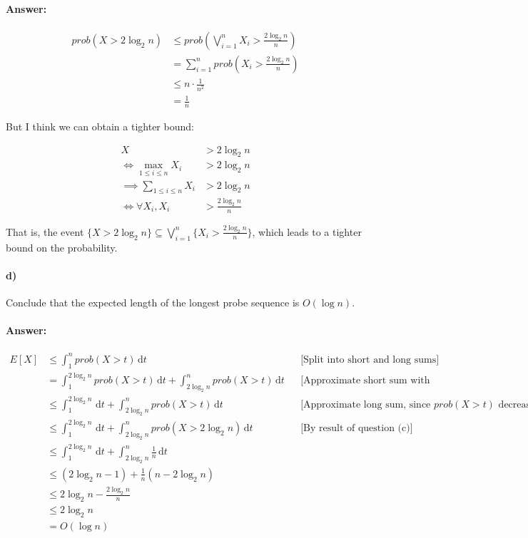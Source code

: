 \documentclass[a4paper]{article}
\begin{document}
\paragraph{Answer:}

\begin{align*}
{prob}(X > 2 \log_2 n) & \le {prob}(\bigvee\limits_{i=1}^n X_i > \frac{2 \log_2 n}{n}) \\
& = \sum\limits_{i=1}^n {prob}(X_i > \frac{2 \log_2 n}{n}) \\
& \le n \cdot \frac{1}{n^2} \\
& = \frac{1}{n}
\end{align*}

But I think we can obtain a tighter bound:

\begin{align*}
X & > 2 \log_2 n \\
\iff \max\limits_{1 \le i \le n} X_i & > 2 \log_2 n \\
\implies \sum\limits_{1 \le i \le n} X_i & > 2 \log_2 n \\
\iff \forall X_i, X_i & > \frac{2 \log_2 n}{n}
\end{align*}

That is, the event $\{X > 2 \log_2 n\} \subseteq \bigvee\limits_{i=1}^n \{X_i > \frac{2 \log_2 n}{n}\}$, which leads to a tighter bound on the probability.

\paragraph{d)} Conclude that the expected length of the longest probe sequence is $O(\log n)$.

\paragraph{Answer:}

\begin{align*}
E[X] & \le \int_1^n \! {prob}(X > t) \, \mathrm{d}t && \text{[Split into short and long sums]} \\
& = \int_1^{2 \log_2 n} \! {prob}(X > t) \, \mathrm{d}t + \int_{2 \log_2 n}^n \! {prob}(X > t) \, \mathrm{d}t && \text{[Approximate short sum with probability = 1]} \\
& \le \int_1^{2 \log_2 n} \! \, \mathrm{d}t + \int_{2 \log_2 n}^n \! {prob}(X > t) \, \mathrm{d}t && \text{[Approximate long sum, since ${prob}(X > t)$ decreases]} \\
& \le \int_1^{2 \log_2 n} \! \, \mathrm{d}t + \int_{2 \log_2 n}^n \! {prob}(X > 2 \log_2 n) \, \mathrm{d}t && \text{[By result of question (c)]}\\
& \le \int_1^{2 \log_2 n} \! \, \mathrm{d}t + \int_{2 \log_2 n}^n \! \frac{1}{n} \, \mathrm{d}t \\
& \le (2\log_2 n - 1) + \frac{1}{n} (n - 2\log_2 n) \\
& \le 2\log_2 n - \frac{2\log_2 n}{n} \\
& \le 2\log_2 n \\
& = O(\log n)
\end{align*}
\end{document}
